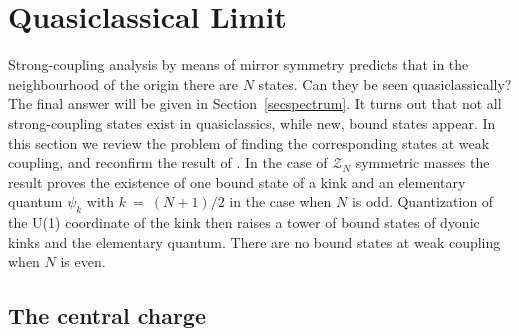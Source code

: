 \documentclass[epsfig,12pt]{article}
\newcommand{\mc}[1]{\mathcal{#1}}
\begin{document}
\section{Quasiclassical Limit}
\label{qclassics}
\setcounter{equation}{0}

	Strong-coupling analysis by means of mirror symmetry predicts that in the neighbourhood of the origin
	there are $ N $ states.
	Can they be seen quasiclassically?
	The final answer will be given in Section~\ref{secspectrum}.
	It turns out that not all strong-coupling states exist in quasiclassics, while new, bound states appear.
	In this section we review the problem of finding the corresponding states at weak coupling, and 
	reconfirm the result of 
\cite{Dorey:1998yh}.
	In the case of $ \mc{Z}_N $ symmetric masses the result proves the existence of one bound state of a kink
	and an elementary quantum $ \psi_k $ with $ k ~=~ (N+1)/2 $ in the case when $ N $ is odd.
	Quantization of the U(1) coordinate of the kink then raises a tower of bound states of dyonic kinks
	and the elementary quantum.
	There are no bound states at weak coupling when $ N $ is even.



\subsection{The central charge}
\end{document}
